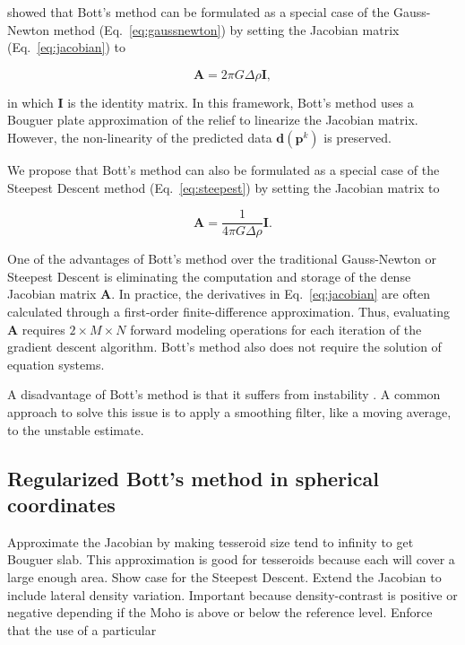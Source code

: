 \documentclass[extra,mreferee]{gji}
\begin{document}
\citet{silva_fast_2014} showed that Bott's method can be formulated as
a special case of the Gauss-Newton method (Eq.~\ref{eq:gaussnewton})
by setting the Jacobian matrix (Eq.~\ref{eq:jacobian}) to

\begin{equation}
    \mathbf{A} = 2\pi G \Delta \rho \mathbf{I},
    \label{eq:bott-jacobian}
\end{equation}

\noindent
in which $\mathbf{I}$ is the identity matrix.
In this framework,
Bott's method uses a Bouguer plate approximation of the relief to
linearize the Jacobian matrix.
However, the non-linearity of the predicted data $\mathbf{d}(\mathbf{p}^k)$ is
preserved.

We propose that Bott's method can also be formulated as a special case of the
Steepest Descent method (Eq.~\ref{eq:steepest}) by setting the Jacobian matrix to

\begin{equation}
    \mathbf{A} = \dfrac{1}{4 \pi G \Delta \rho}\mathbf{I}.
    \label{eq:bott-steepest}
\end{equation}

One of the advantages of Bott's method over the traditional Gauss-Newton or
Steepest Descent is eliminating the computation and storage of the dense
Jacobian matrix $\mathbf{A}$.
In practice, the derivatives in Eq.~\ref{eq:jacobian} are often calculated through a
first-order finite-difference approximation.
Thus, evaluating $\mathbf{A}$ requires $2\times M \times N$ forward modeling
operations for each iteration of the gradient descent algorithm.
Bott's method also does not require the solution of equation systems.

A disadvantage of Bott's method is that it suffers from instability
\citep{silva_fast_2014}.
A common approach to solve this issue is to apply a smoothing filter, like a
moving average, to the unstable estimate.


\subsection{Regularized Bott's method in spherical coordinates}

Approximate the Jacobian by making tesseroid size tend to infinity to get
Bouguer slab.
This approximation is good for tesseroids because each will cover a large
enough area.
Show case for the Steepest Descent.
Extend the Jacobian to include lateral density variation.
Important because density-contrast is positive or negative depending if the
Moho is above or below the reference level.
Enforce that the use of a particular
\end{document}
